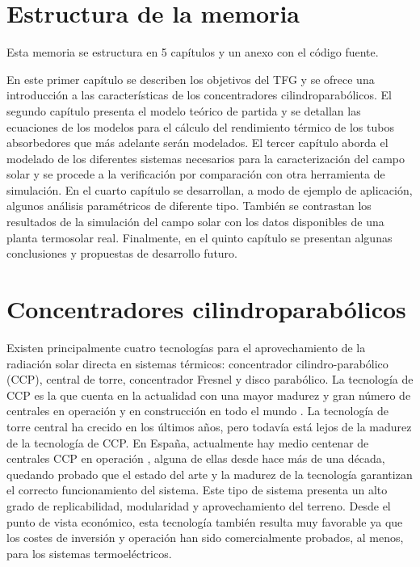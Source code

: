 \section{Estructura de la memoria}
Esta memoria se estructura en 5 capítulos y un anexo con el código fuente.

En este primer capítulo se describen los objetivos del TFG y se ofrece una introducción a las características de los concentradores cilindroparabólicos. 
El segundo capítulo presenta el modelo teórico de partida y se detallan las ecuaciones de los modelos para el cálculo del rendimiento térmico de los tubos absorbedores que más adelante serán modelados.
El tercer capítulo aborda el modelado de los diferentes sistemas necesarios para la caracterización del campo solar y se procede a la verificación por comparación con otra herramienta de simulación.
En el cuarto capítulo se desarrollan, a modo de ejemplo de aplicación, algunos análisis paramétricos de diferente tipo. También se contrastan los resultados de la simulación del campo solar con los datos disponibles de una planta termosolar real.
Finalmente, en el quinto capítulo se presentan algunas conclusiones y propuestas de desarrollo futuro.

\section{Concentradores cilindroparabólicos}

Existen principalmente cuatro tecnologías para el aprovechamiento de la radiación solar directa en sistemas térmicos: concentrador cilindro-parabólico (CCP), central de torre, concentrador Fresnel y disco parabólico. La tecnología de CCP es la que cuenta en la actualidad con una mayor madurez y gran número de centrales en operación y en construcción en todo el mundo \cite{islamComprehensiveReviewStateoftheart2018}. La tecnología de torre central ha crecido en los últimos años, pero todavía está lejos de la madurez de la tecnología de CCP. En España, actualmente hay medio centenar de centrales CCP en operación \cite{Protermosolar}, alguna de ellas desde hace más de una década, quedando probado que el estado del arte y la madurez de la tecnología garantizan el correcto funcionamiento del sistema. Este tipo de sistema presenta un alto grado de replicabilidad, modularidad y aprovechamiento del terreno. Desde el punto de vista económico, esta tecnología también resulta muy favorable ya que los costes de inversión y operación han sido comercialmente probados, al menos, para los sistemas termoeléctricos.


